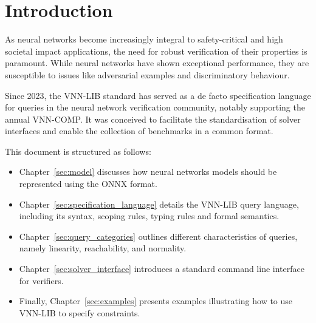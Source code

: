 \chapter{Introduction}
\label{sec:intro}

As neural networks become increasingly integral to safety-critical and high societal impact applications\cite{1, 2, 3}, 
the need for robust verification of their properties is paramount. While neural networks have shown exceptional performance, 
they are susceptible to issues like adversarial examples\cite{3} and discriminatory behaviour\cite{4}.

Since 2023, the VNN-LIB standard\cite{5} has served as a de facto specification language for queries in the neural network verification 
community, notably supporting the annual VNN-COMP\cite{7}. It was conceived to facilitate the standardisation of solver interfaces and 
enable the collection of benchmarks in a common format. 

This document is structured as follows:
\begin{itemize}
\item Chapter~\ref{sec:model} discusses how neural networks models should be represented using the ONNX format.
\item Chapter~\ref{sec:specification_language} details the VNN-LIB query language, including its syntax, scoping rules, typing rules and formal semantics.
\item Chapter~\ref{sec:query_categories} outlines different characteristics of queries, namely linearity, 
reachability, and normality.
\item  Chapter~\ref{sec:solver_interface} introduces a standard command line interface for verifiers.
\item Finally, Chapter~\ref{sec:examples} 
presents examples illustrating how to use VNN-LIB to specify constraints.
\end{itemize}
